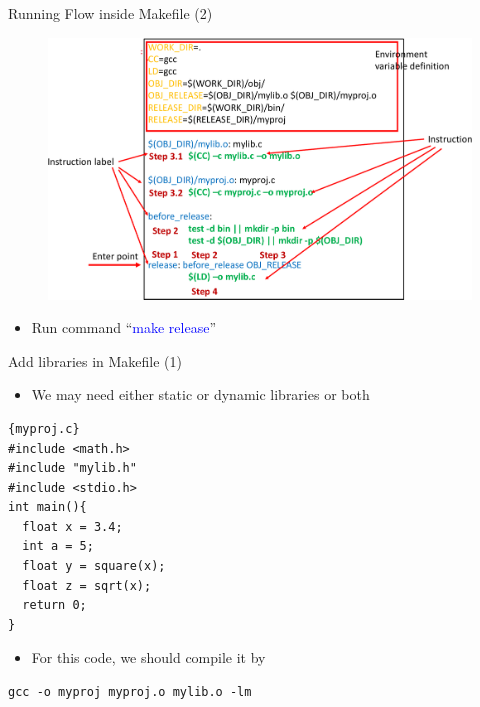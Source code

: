 \begin{frame}{Running Flow inside Makefile (2)}
\begin{figure}
	\includegraphics[width=0.80\linewidth]{figs/make2.pdf}
\end{figure}
\begin{itemize}
	\item {Run command ``\textcolor{blue}{make release}''}
\end{itemize}
\end{frame}

\begin{frame}[fragile]{Add libraries in Makefile (1)}
\begin{itemize}
	\item {We may need either static or dynamic libraries or both}
\end{itemize}
\begin{lstlisting}[linewidth=0.9\linewidth, firstnumber=1, xleftmargin=0.05\linewidth]{myproj.c}
#include <math.h>
#include "mylib.h"
#include <stdio.h>
int main(){
  float x = 3.4;
  int a = 5;
  float y = square(x);
  float z = sqrt(x);
  return 0;
}
\end{lstlisting}
\begin{itemize}
	\item {For this code, we should compile it by}
\end{itemize}
\begin{lstlisting}[linewidth=0.9\linewidth, xleftmargin=0.05\linewidth]
gcc -o myproj myproj.o mylib.o -lm
\end{lstlisting}
\end{frame}

